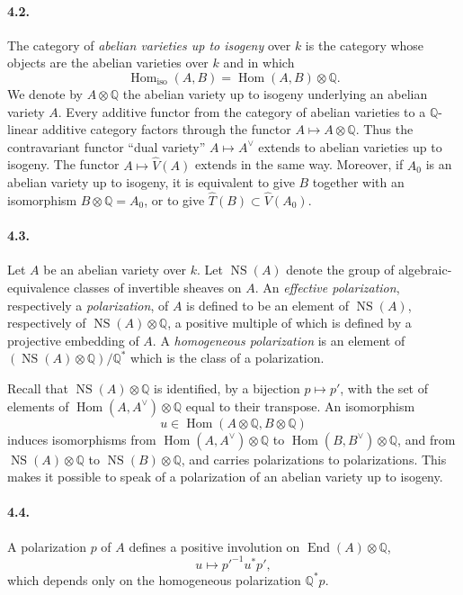 \documentclass[10pt]{article}
\newcommand{\Q}{\mathbb Q}
\newcommand{\Hom}{\operatorname{Hom}}
\newcommand{\End}{\operatorname{End}}
\newcommand{\NS}{\operatorname{NS}}
\begin{document}
\paragraph{4.2.} The category of \emph{abelian varieties up to isogeny} over $k$ is the category whose objects are the abelian varieties over $k$ and in which
\[
\Hom_{\mathrm{iso}}(A,B)=\Hom(A,B)\otimes\Q.
\]
We denote by $A\otimes\Q$ the abelian variety up to isogeny underlying an abelian variety $A$. Every additive functor from the category of abelian varieties to a $\Q$-linear additive category factors through the functor $A\mapsto A\otimes\Q$. Thus the contravariant functor ``dual variety'' $A\mapsto A^\vee$ extends to abelian varieties up to isogeny. The functor $A\mapsto\widehat V(A)$ extends in the same way. Moreover, if $A_0$ is an abelian variety up to isogeny, it is equivalent to give $B$ together with an isomorphism $B\otimes\Q=A_0$, or to give $\widehat T(B)\subset\widehat V(A_0)$.

\paragraph{4.3.} Let $A$ be an abelian variety over $k$. Let $\NS(A)$ denote the group of algebraic-equivalence classes of invertible sheaves on $A$. An \emph{effective polarization}, respectively a \emph{polarization}, of $A$ is defined to be an element of $\NS(A)$, respectively of $\NS(A)\otimes\Q$, a positive multiple of which is defined by a projective embedding of $A$. A \emph{homogeneous polarization} is an element of $(\NS(A)\otimes\Q)/\Q^*$ which is the class of a polarization.

Recall that $\NS(A)\otimes\Q$ is identified, by a bijection $p\mapsto p'$, with the set of elements of $\Hom(A,A^\vee)\otimes\Q$ equal to their transpose. An isomorphism
\[
u\in\Hom(A\otimes\Q,B\otimes\Q)
\]
induces isomorphisms from $\Hom(A,A^\vee)\otimes\Q$ to $\Hom(B,B^\vee)\otimes\Q$, and from $\NS(A)\otimes\Q$ to $\NS(B)\otimes\Q$, and carries polarizations to polarizations. This makes it possible to speak of a polarization of an abelian variety up to isogeny.

\paragraph{4.4.} A polarization $p$ of $A$ defines a positive involution on $\End(A)\otimes\Q$,
\[
u\longmapsto p'^{-1}u^*p',
\]
which depends only on the homogeneous polarization $\Q^*p$.
\end{document}
